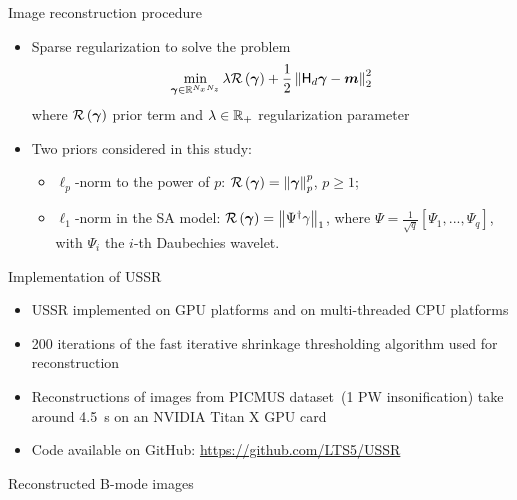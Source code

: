 {\begin{block}{Image reconstruction procedure}
\begin{itemize}
		\item Sparse regularization to solve the problem
		\begin{align}
			\label{eq_regularization_problem}
			\min \limits_{\bm{\gamma} \in \mathbb{R}^{N_xN_z}} \lambda \mathcal{R} \left(\bm{\gamma}\right) + \frac{1}{2} \left\lVert\mathsf{H}_d \bm{\gamma} - \bm{m}\right\rVert_{2}^2
		\end{align}
		where $\mathcal{R} \left(\bm{\gamma}\right)$ prior term and $\lambda \in \mathbb{R}_+$ regularization parameter
		\item Two priors considered in this study:
		\begin{itemize}
			\item $\ell_p$-norm to the power of $p$: $\mathcal{R}\left(\bm{\gamma}\right) = \left\lVert\bm{\gamma}\right\rVert_{p}^p$, $p \geq 1$;
			\item $\ell_1$-norm in the SA model: $\mathcal{R}\left(\bm{\gamma}\right) = \left\lVert\Psi^\dagger\gamma\right\rVert_{1}$, where $\Psi = \frac{1}{\sqrt{q}}\left[\Psi_1,...,\Psi_q\right]$, with $\Psi_i$ the $i$-th Daubechies wavelet.
		\end{itemize}
	\end{itemize}
\end{block}
\vfill
\begin{block}{Implementation of USSR}
	\begin{itemize}
		\item USSR implemented on GPU platforms and on multi-threaded CPU platforms
		\item \num{200} iterations of the fast iterative shrinkage thresholding algorithm used for reconstruction 
		\item Reconstructions of images from PICMUS dataset~(1 PW insonification) take around \SI{4.5}{\second} on an NVIDIA Titan X GPU card
		\item Code available on GitHub: \url{https://github.com/LTS5/USSR}
	\end{itemize}
\end{block}
\begin{block}{Reconstructed B-mode images}
	

\end{block}}

